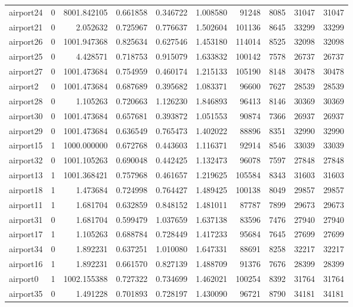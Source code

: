 \documentclass[../../../thesis.tex]{subfiles}
\begin{document}
\begin{longtable}{|l|r|r|r|r|r|r|r|r|r|}
airport24 & 0 & 8001.842105 & 0.661858 & 0.346722 & 1.008580 & 91248 & 8085 & 31047 & 31047 \\
airport21 & 0 & 2.052632 & 0.725967 & 0.776637 & 1.502604 & 101136 & 8645 & 33299 & 33299 \\
airport26 & 0 & 1001.947368 & 0.825634 & 0.627546 & 1.453180 & 114014 & 8525 & 32098 & 32098 \\
airport25 & 0 & 4.428571 & 0.718753 & 0.915079 & 1.633832 & 100142 & 7578 & 26737 & 26737 \\
airport27 & 0 & 1001.473684 & 0.754959 & 0.460174 & 1.215133 & 105190 & 8148 & 30478 & 30478 \\
airport2 & 0 & 1001.473684 & 0.687689 & 0.395682 & 1.083371 & 96600 & 7627 & 28539 & 28539 \\
airport28 & 0 & 1.105263 & 0.720663 & 1.126230 & 1.846893 & 96413 & 8146 & 30369 & 30369 \\
airport30 & 0 & 1001.473684 & 0.657681 & 0.393872 & 1.051553 & 90874 & 7366 & 26937 & 26937 \\
airport29 & 0 & 1001.473684 & 0.636549 & 0.765473 & 1.402022 & 88896 & 8351 & 32990 & 32990 \\
airport15 & 1 & 1000.000000 & 0.672768 & 0.443603 & 1.116371 & 92914 & 8546 & 33039 & 33039 \\
airport32 & 0 & 1001.105263 & 0.690048 & 0.442425 & 1.132473 & 96078 & 7597 & 27848 & 27848 \\
airport13 & 1 & 1001.368421 & 0.757968 & 0.461657 & 1.219625 & 105584 & 8343 & 31603 & 31603 \\
airport18 & 1 & 1.473684 & 0.724998 & 0.764427 & 1.489425 & 100138 & 8049 & 29857 & 29857 \\
airport11 & 1 & 1.681704 & 0.632859 & 0.848152 & 1.481011 & 87787 & 7899 & 29673 & 29673 \\
airport31 & 0 & 1.681704 & 0.599479 & 1.037659 & 1.637138 & 83596 & 7476 & 27940 & 27940 \\
airport17 & 1 & 1.105263 & 0.688784 & 0.728449 & 1.417233 & 95684 & 7645 & 27699 & 27699 \\
airport34 & 0 & 1.892231 & 0.637251 & 1.010080 & 1.647331 & 88691 & 8258 & 32217 & 32217 \\
airport16 & 1 & 1.892231 & 0.661570 & 0.827139 & 1.488709 & 91376 & 7676 & 28399 & 28399 \\
airport0 & 1 & 1002.155388 & 0.727322 & 0.734699 & 1.462021 & 100254 & 8392 & 31764 & 31764 \\
airport35 & 0 & 1.491228 & 0.701893 & 0.728197 & 1.430090 & 96721 & 8790 & 34181 & 34181 \\

\end{longtable}
\end{document}
